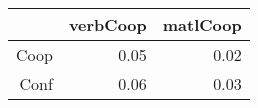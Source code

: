 \begin{table}[ht]
\centering
\begin{tabular}{rrr}
  \hline
 & verbCoop & matlCoop \\ 
  \hline
Coop & 0.05 & 0.02 \\ 
  Conf & 0.06 & 0.03 \\ 
   \hline
\end{tabular}
\end{table}
